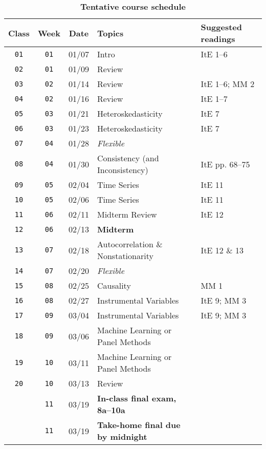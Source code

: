 \documentclass[10pt]{article}
\newcommand{\ra}[1]{\renewcommand{\arraystretch}{#1}}
\begin{document}
\begin{table}[htb]
  \centering
  \caption*{\textbf{Tentative course schedule}}
  \ra{1.5}
  \begin{tabular}{@{\extracolsep{1cm}} c c c l l @{}}
    \toprule
    Class & Week & Date & Topics & Suggested readings  \\ \toprule
    \texttt{01} & \texttt{01} & 01/07 & Intro & ItE 1--6 \\
    \texttt{02} & \texttt{01} & 01/09 & Review \\
    \texttt{03} & \texttt{02} & 01/14 & Review & ItE 1--6; MM 2 \\
    \texttt{04} & \texttt{02} & 01/16 & Review & ItE 1--7 \\
    \texttt{05} & \texttt{03} & 01/21 & Heteroskedasticity & ItE 7 \\
    \texttt{06} & \texttt{03} & 01/23 & Heteroskedasticity & ItE 7 \\
    \texttt{07} & \texttt{04} & 01/28 & \textit{Flexible} \\
    \texttt{08} & \texttt{04} & 01/30 & Consistency (and Inconsistency) & ItE pp. 68--75  \\
    \texttt{09} & \texttt{05} & 02/04 & Time Series & ItE 11  \\
    \texttt{10} & \texttt{05} & 02/06 & Time Series & ItE 11  \\
    \texttt{11} & \texttt{06} & 02/11 & Midterm Review & ItE 12 \\ 
    \midrule
    \texttt{12} & \texttt{06} & 02/13 & \textbf{Midterm} \\ 
    \midrule
    \texttt{13} & \texttt{07} & 02/18 & Autocorrelation \& Nonstationarity & ItE 12 \& 13 \\
    \texttt{14} & \texttt{07} & 02/20 & \textit{Flexible} \\
    \texttt{15} & \texttt{08} & 02/25 & Causality & MM 1 \\
    \texttt{16} & \texttt{08} & 02/27 & Instrumental Variables & ItE 9; MM 3 \\
    \texttt{17} & \texttt{09} & 03/04 & Instrumental Variables & ItE 9; MM 3 \\
    \texttt{18} & \texttt{09} & 03/06 & Machine Learning or Panel Methods \\
    \texttt{19} & \texttt{10} & 03/11 & Machine Learning or Panel Methods \\
    \texttt{20} & \texttt{10} & 03/13 & Review \\
    \midrule
    \texttt{  } & \texttt{11} & 03/19 & \textbf{In-class final exam, 8a--10a} & \\
    \texttt{  } & \texttt{11} & 03/19 & \textbf{Take-home final due by midnight} \\
    \bottomrule
  \end{tabular}
\end{table}
\end{document}
